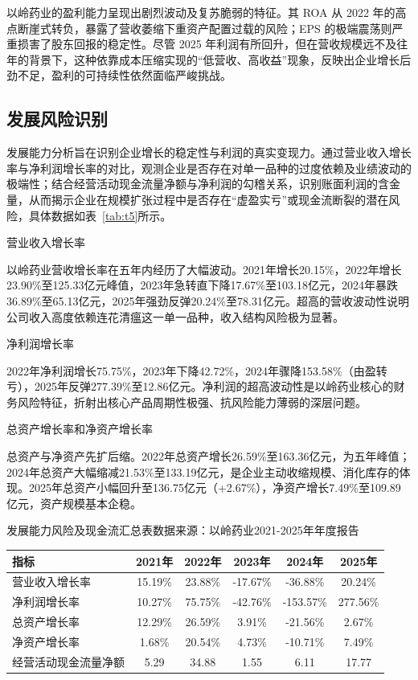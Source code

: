\documentclass[12pt,a4paper,fontset=windows,UTF8]{ctexart}
\begin{document}
以岭药业的盈利能力呈现出剧烈波动及复苏脆弱的特征。其 ROA 从 2022 年的高点断崖式转负，暴露了营收萎缩下重资产配置过载的风险；EPS 的极端震荡则严重损害了股东回报的稳定性。尽管 2025 年利润有所回升，但在营收规模远不及往年的背景下，这种依靠成本压缩实现的“低营收、高收益”现象，反映出企业增长后劲不足，盈利的可持续性依然面临严峻挑战。

\subsection{发展风险识别}
发展能力分析旨在识别企业增长的稳定性与利润的真实变现力。通过营业收入增长率与净利润增长率的对比，观测企业是否存在对单一品种的过度依赖及业绩波动的极端性；结合经营活动现金流量净额与净利润的勾稽关系，识别账面利润的含金量，从而揭示企业在规模扩张过程中是否存在“虚盈实亏”或现金流断裂的潜在风险，具体数据如表~\ref{tab:t5}所示。

营业收入增长率

以岭药业营收增长率在五年内经历了大幅波动。2021年增长20.15\%，2022年增长23.90\%至125.33亿元峰值，2023年急转直下降17.67\%至103.18亿元，2024年暴跌36.89\%至65.13亿元，2025年强劲反弹20.24\%至78.31亿元。超高的营收波动性说明公司收入高度依赖连花清瘟这一单一品种，收入结构风险极为显著。

净利润增长率

2022年净利润增长75.75\%，2023年下降42.72\%，2024年骤降153.58\%（由盈转亏），2025年反弹277.39\%至12.86亿元。净利润的超高波动性是以岭药业核心的财务风险特征，折射出核心产品周期性极强、抗风险能力薄弱的深层问题。

总资产增长率和净资产增长率

总资产与净资产先扩后缩。2022年总资产增长26.59\%至163.36亿元，为五年峰值；2024年总资产大幅缩减21.53\%至133.19亿元，是企业主动收缩规模、消化库存的体现。2025年总资产小幅回升至136.75亿元（+2.67\%），净资产增长7.49\%至109.89亿元，资产规模基本企稳。

\begin{thesTab}[htbp]{发展能力风险及现金流汇总表\label{tab:t5}}{数据来源：以岭药业2021-2025年年度报告}
\begin{tabularx}{\linewidth}{X c c c c c}
  \toprule
  指标 & 2021年 & 2022年 & 2023年 & 2024年 & 2025年 \\
  \midrule
  营业收入增长率 & 15.19\% & 23.88\% & -17.67\% & -36.88\% & 20.24\% \\
  净利润增长率 & 10.27\% & 75.75\% & -42.76\% & -153.57\% & 277.56\% \\
  总资产增长率 & 12.29\% & 26.59\% & 3.91\% & -21.56\% & 2.67\% \\
  净资产增长率 & 1.68\% & 20.54\% & 4.73\% & -10.71\% & 7.49\% \\
  经营活动现金流量净额 & 5.29 & 34.88 & 1.55 & 6.11 & 17.77 \\
  \bottomrule
\end{tabularx}
\end{thesTab}
\end{document}
